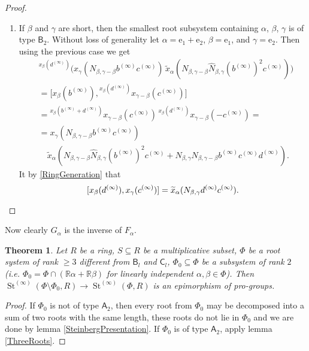 \documentclass{article}
\numberwithin{equation}{section}
\newtheorem{theorem}{Theorem}
\theoremstyle{definition}
\theoremstyle{remark}
\DeclareMathOperator\St{St}
\newcommand{\up}[2]{{^{#1}\!{#2}}}
\newcommand{\rA}{\mathsf{A}}
\newcommand{\rB}{\mathsf{B}}
\newcommand{\rC}{\mathsf{C}}
\begin{document}
\begin{proof}
\begin{enumerate}
 \item If \(\beta\) and \(\gamma\) are short, then the smallest root subsystem containing \(\alpha\), \(\beta\), \(\gamma\) is of type \(\rB_2\). Without loss of generality let \(\alpha = \mathrm e_1 + \mathrm e_2\), \(\beta = \mathrm e_1\), and \(\gamma = \mathrm e_2\). Then using the previous case we get
 \begin{align*}
  &\up{x_\beta(d^{(\infty)})}
   {\bigl(x_\gamma(N_{\beta, \gamma - \beta} b^{(\infty)} c^{(\infty)})\,
   \widetilde x_\alpha(N_{\beta, \gamma - \beta} \widehat N_{\beta, \gamma}
   (b^{(\infty)})^2 c^{(\infty)})\bigr)}\\
  &= \bigl[x_\beta(b^{(\infty)}),
  \up{x_\beta(d^{(\infty)})}
   {x_{\gamma - \beta}(c^{(\infty)})}\bigr]\\
  &= \up{x_\beta(b^{(\infty)} + d^{(\infty)})}
   {x_{\gamma - \beta}(c^{(\infty)})}\,
  \up{x_\beta(d^{(\infty)})}
   {x_{\gamma - \beta}(-c^{(\infty)})} =\\
  &= x_\gamma(N_{\beta, \gamma - \beta} b^{(\infty)} c^{(\infty)})\\
  &\quad \widetilde x_\alpha(N_{\beta, \gamma - \beta} \widehat N_{\beta, \gamma}
   (b^{(\infty)})^2 c^{(\infty)}
   + N_{\beta, \gamma} N_{\beta, \gamma - \beta}
   b^{(\infty)} c^{(\infty)} d^{(\infty)}).
 \end{align*}
 It by \cref{RingGeneration} that
 \[[x_\beta(d^{(\infty)}), x_\gamma(c^{(\infty)})] 
 = \widetilde x_\alpha(N_{\beta, \gamma} d^{(\infty)} c^{(\infty)}).\qedhere\]
 \end{enumerate}
\end{proof}
 
 Now clearly \(G_\alpha\) is the inverse of \(F_\alpha\).


 \begin{theorem}\label{DoubleRootElimination}
  Let \(R\) be a ring, \(S \subseteq R\) be a multiplicative subset, \(\Phi\) be a root system of rank \(\geq 3\) different from \(\rB_l\) and \(\rC_l\), \(\Phi_0 \subseteq \Phi\) be a subsystem of rank \(2\) (i.e. \(\Phi_0 = \Phi \cap (\mathbb R\alpha + \mathbb R\beta)\) for linearly independent \(\alpha, \beta \in \Phi\)). Then \(\St^{(\infty)}(\Phi \setminus \Phi_0, R) \to \St^{(\infty)}(\Phi, R)\) is an epimorphism of pro-groups.
 \end{theorem}
 \begin{proof}
  If \(\Phi_0\) is not of type \(\rA_2\), then every root from \(\Phi_0\) may be decomposed into a sum of two roots with the same length, these roots do not lie in \(\Phi_0\) and we are done by lemma \ref{SteinbergPresentation}. If \(\Phi_0\) is of type \(\rA_2\), apply lemma \ref{ThreeRoots}.
 \end{proof}
\end{document}
